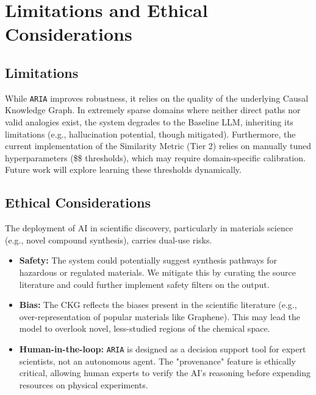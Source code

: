 \section{Limitations and Ethical Considerations}

\subsection{Limitations}
While \texttt{ARIA} improves robustness, it relies on the quality of the underlying Causal Knowledge Graph. In extremely sparse domains where neither direct paths nor valid analogies exist, the system degrades to the Baseline LLM, inheriting its limitations (e.g., hallucination potential, though mitigated). Furthermore, the current implementation of the Similarity Metric (Tier 2) relies on manually tuned hyperparameters (\$\tau\$ thresholds), which may require domain-specific calibration. Future work will explore learning these thresholds dynamically.

\subsection{Ethical Considerations}
The deployment of AI in scientific discovery, particularly in materials science (e.g., novel compound synthesis), carries dual-use risks.
\begin{itemize}
    \item \textbf{Safety:} The system could potentially suggest synthesis pathways for hazardous or regulated materials. We mitigate this by curating the source literature and could further implement safety filters on the output.
    \item \textbf{Bias:} The CKG reflects the biases present in the scientific literature (e.g., over-representation of popular materials like Graphene). This may lead the model to overlook novel, less-studied regions of the chemical space.
    \item \textbf{Human-in-the-loop:} \texttt{ARIA} is designed as a decision support tool for expert scientists, not an autonomous agent. The "provenance" feature is ethically critical, allowing human experts to verify the AI's reasoning before expending resources on physical experiments.
\end{itemize}
